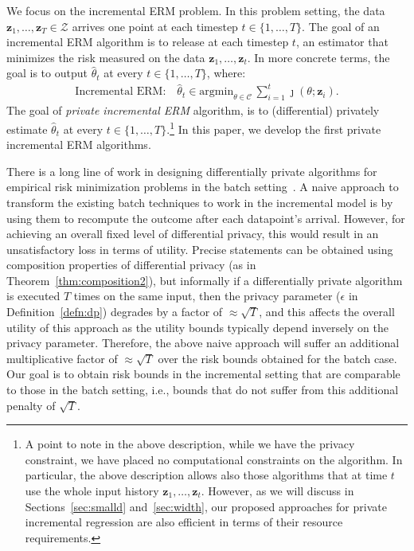 \documentclass{article}
\theoremstyle{plain}
\def \eps {\epsilon}
\def \z {\mathbf z}
\def \CCC {\mathcal{C}}
\def \ZZZ {\mathcal{Z}}
\begin{document}
We focus on the incremental ERM problem.  In this problem setting, the data $\z_1,\dots,\z_T \in \ZZZ$ arrives one point at each timestep $t \in \{1,\dots,T\}$. The goal of an incremental ERM algorithm is to release at each timestep $t$, an estimator that minimizes the risk measured on the data $\z_1,\dots,\z_t$. In more concrete terms, the goal is to output $\hat{\theta}_t$ at every $t \in \{1,\dots,T\}$, where: 
\begin{align*}
\mbox{Incremental ERM:} \quad \hat{\theta}_t \in \mbox{argmin}_{\theta \in \CCC}\,\sum_{i=1}^t \jmath(\theta;\z_i).
\end{align*}
The goal of {\em private incremental ERM} algorithm, is to (differential) privately estimate $\hat{\theta}_t$ at every $t \in \{1,\dots,T\}$.\!\footnote{A point to note in the above description, while we have the privacy constraint, we have placed no computational constraints on the algorithm. In particular, the above description allows also those algorithms that at time $t$ use the whole input history $\z_1,\dots,\z_t$. However, as we will discuss in Sections~\ref{sec:smalld} and~\ref{sec:width}, our proposed approaches for private incremental regression are also efficient in terms of their resource requirements.} In this paper, we develop the first private incremental ERM algorithms.

There is a long line of work in designing differentially private algorithms for empirical risk minimization problems in the batch setting~\cite{rubinstein2009learning,kifer2012private,jain2013differentially,thakurta2013differentially,jain2014near,bassily2014differentially,duchi2013local,ullman2015private,talwar2014private}. A naive approach to transform the existing batch techniques to work in the incremental model is by using them to recompute the outcome after each datapoint's arrival. However, for achieving an overall fixed level of differential privacy, this would result in an unsatisfactory loss in terms of utility. Precise statements can be obtained using composition properties of differential privacy (as in Theorem~\ref{thm:composition2}), but informally if a differentially private algorithm is executed $T$ times on the same input, then the privacy parameter ($\eps$ in Definition~\ref{defn:dp}) degrades by a factor of $\approx\sqrt{T}$, and this affects the overall utility of this approach as the utility bounds typically depend inversely on the privacy parameter. Therefore, the above naive approach will suffer an additional multiplicative factor of $\approx \sqrt{T}$ over the risk bounds obtained for the batch case.
Our goal is to obtain risk bounds in the incremental setting that are comparable to those in the batch setting, i.e., bounds that do not suffer from this additional penalty of $\sqrt{T}$.
\end{document}
